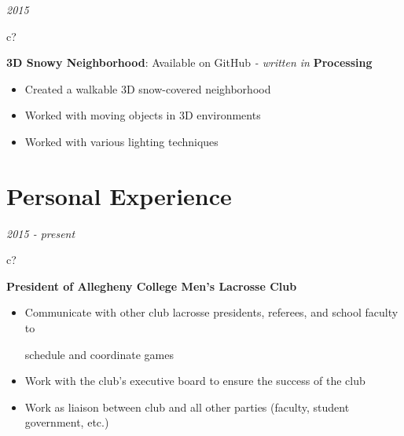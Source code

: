 \documentclass[12pt,a4paper,sans]{moderncv} %
\begin{document}
 
 \hspace{11 mm}
\textit{2015}
\hspace{2 mm}
\begin{tabular}{c?}
 \\
\end{tabular}
 \hspace{2 mm}
 \textbf{3D Snowy Neighborhood}: Available on GitHub
 \textit{- written in} \textbf{Processing}
 
 \vspace{-1 mm}
 \begin{itemize}
 \addtolength{\itemindent}{31.7 mm}
 \item{Created a walkable 3D snow-covered neighborhood}
 \item{Worked with moving objects in 3D environments }
 \item{Worked with various lighting techniques}
 \end{itemize}

\vspace{5 mm}
\section{Personal Experience}

\textit{2015 - present}
\hspace{-1.7 mm}
\begin{tabular}{c?}
 \\
\end{tabular}
 \hspace{2 mm}
 \textbf{President of Allegheny College Men's Lacrosse Club} 
 \vspace{0 mm}
 \begin{itemize}
 \addtolength{\itemindent}{31.7 mm}
 \item{Communicate with other club lacrosse presidents, referees, and school faculty to 
 
 \hspace{32 mm}schedule and coordinate games}
 
 
 \item{Work with the club's executive board to ensure the success of the club }
 \item{Work as liaison between club and all other parties (faculty, student government, etc.)}
 \end{itemize}
 
\end{document}
